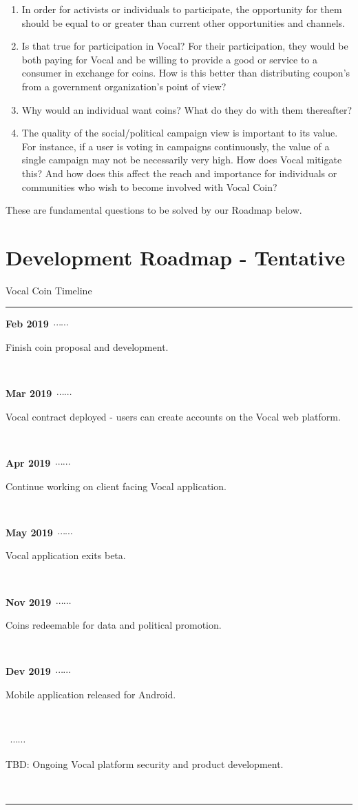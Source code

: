 \documentclass[conference]{IEEEtran}
\begin{document}
    \begin{enumerate}
      \item In order for activists or individuals to participate, the opportunity for them should be equal to or greater than current other opportunities and channels.
      \item Is that true for participation in Vocal? For their participation, they would be both paying for Vocal and be willing to provide a good or service to a consumer in exchange for coins. How is this better than distributing coupon’s from a government organization’s point of view?
      \item Why would an individual want coins? What do they do with them thereafter?
      \item The quality of the social/political campaign view is important to its value. For instance, if a user is voting in campaigns continuously, the value of a single campaign may not be necessarily very high. How does Vocal mitigate this? And how does this affect the reach and importance for individuals or communities who wish to become involved with Vocal Coin?
    \end{enumerate}

    These are fundamental questions to be solved by our Roadmap below.
    
    \section{Development Roadmap - Tentative}


    \newcommand\ytl[2]{
    \parbox[b]{8em}{\hfill{\color{cyan}\bfseries\sffamily #1}~$\cdots\cdots$~}\makebox[0pt][c]{$\bullet$}\vrule\quad \parbox[c]{3cm}{\vspace{7pt}\color{red!40!black!80}\raggedright\sffamily #2.\\[7pt]}\\[-3pt]}
    \begin{table}
    \caption{Vocal Coin Timeline}
    \centering
    \begin{minipage}[t]{\linewidth}
    \color{gray}
    \rule{\linewidth}{1pt}
    \ytl{Feb 2019}{Finish coin proposal and development}
    \ytl{Mar 2019}{Vocal contract deployed - users can create accounts on the Vocal web platform}
    \ytl{Apr 2019}{Continue working on client facing Vocal application}
    \ytl{May 2019}{Vocal application exits beta}
    \ytl{Nov 2019}{Coins redeemable for data and political promotion}
    \ytl{Dev 2019}{Mobile application released for Android}
    \ytl{2019}{TBD: Ongoing Vocal platform security and product development}
    \bigskip
    \rule{\linewidth}{1pt}%
    \end{minipage}%
    \end{table}
\end{document}
